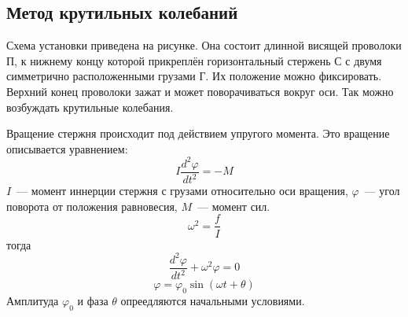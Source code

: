 \subsection{Метод крутильных колебаний}
\begin{figure}[h!]
\end{figure}

Схема установки приведена на рисунке. Она состоит длинной висящей
проволоки П, к нижнему концу которой прикреплён горизонтальный
стержень С с двумя симметрично расположенными грузами Г. Их
положение можно фиксировать. Верхний конец проволоки зажат и может
поворачиваться вокруг оси. Так можно возбуждать крутильные колебания.

Вращение стержня происходит под действием упругого момента. Это
вращение описывается уравнением:
\[I\frac{d^2\varphi}{dt^2}=-M\]
$I$~--- момент иннерции стержня с грузами относительно оси вращения,
$\varphi$~--- угол поворота от положения равновесия, $M$~--- момент сил.
\[\omega^2=\frac{f}{I}\]
тогда
\[\frac{d^2\varphi}{dt^2}+\omega^2\varphi=0\]
\[\varphi=\varphi_0\sin\left(\omega t + \theta\right)\]
Амплитуда $\varphi_0$ и фаза $\theta$ опреедляются начальными условиями.

